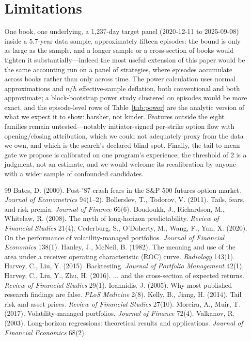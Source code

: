 \documentclass[11pt]{article}
\begin{document}
\section{Limitations}
One book, one underlying, a 1{,}237-day target panel (2020-12-11 to 2025-09-08) inside a
5.7-year data sample, approximately fifteen episodes: the bound is only as
large as the sample, and a longer sample or a cross-section of books would tighten it
substantially---indeed the most useful extension of this paper would be the same accounting run
on a panel of strategies, where episodes accumulate across books rather than only across time.
The power calculation uses normal approximations and $n/h$ effective-sample deflation, both
conventional and both approximate; a block-bootstrap power study clustered on episodes would be
more exact, and the episode-level rows of Table~\ref{tab:power} are the analytic version of
what we expect it to show: harsher, not kinder. Features outside the eight families remain untested---notably
initiator-signed per-strike option flow with opening/closing attribution, which we could not
adequately proxy from the data we own, and which is the search's declared blind spot.
Finally, the tail-to-mean gate we propose is calibrated on one program's experience; the
threshold of 2 is a judgment, not an estimate, and we would welcome its recalibration by anyone
with a wider sample of confounded candidates.

\begin{thebibliography}{99}\small
{} Bates, D. (2000). Post-'87 crash fears in the S\&P 500 futures
option market. \emph{Journal of Econometrics} 94(1--2).
 Bollerslev, T., Todorov, V. (2011). Tails, fears,
and risk premia. \emph{Journal of Finance} 66(6).
 Boudoukh, J., Richardson, M., Whitelaw, R. (2008). The
myth of long-horizon predictability. \emph{Review of Financial Studies} 21(4).
 Cederburg, S., O'Doherty, M., Wang, F., Yan, X. (2020).
On the performance of volatility-managed portfolios. \emph{Journal of Financial Economics}
138(1).
 Hanley, J., McNeil, B. (1982). The meaning and use of the
area under a receiver operating characteristic (ROC) curve. \emph{Radiology} 143(1).
 Harvey, C., Liu, Y. (2015). Backtesting. \emph{Journal of
Portfolio Management} 42(1).
 Harvey, C., Liu, Y., Zhu, H. (2016). $\ldots$ and the
cross-section of expected returns. \emph{Review of Financial Studies} 29(1).
 Ioannidis, J. (2005). Why most published research findings are
false. \emph{PLoS Medicine} 2(8).
 Kelly, B., Jiang, H. (2014). Tail risk and asset prices.
\emph{Review of Financial Studies} 27(10).
 Moreira, A., Muir, T. (2017). Volatility-managed
portfolios. \emph{Journal of Finance} 72(4).
 Valkanov, R. (2003). Long-horizon regressions: theoretical
results and applications. \emph{Journal of Financial Economics} 68(2).
\end{thebibliography}
\end{document}

